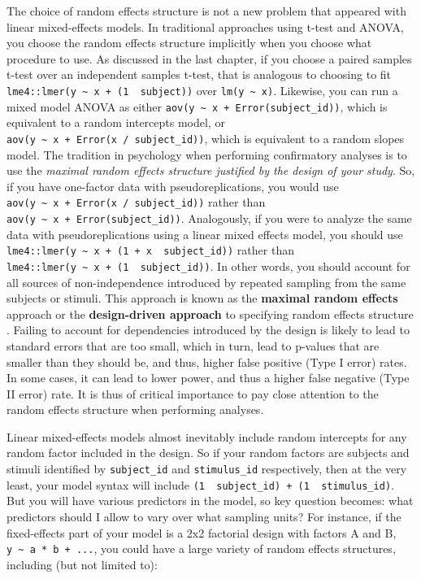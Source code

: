 \documentclass[]{book}
\begin{document}
The choice of random effects structure is not a new problem that appeared with linear mixed-effects models. In traditional approaches using t-test and ANOVA, you choose the random effects structure implicitly when you choose what procedure to use. As discussed in the last chapter, if you choose a paired samples t-test over an independent samples t-test, that is analogous to choosing to fit \texttt{lme4::lmer(y\ \textasciitilde{}\ x\ +\ (1\ \textbar{}\ subject))} over \texttt{lm(y\ \textasciitilde{}\ x)}. Likewise, you can run a mixed model ANOVA as either \texttt{aov(y\ \textasciitilde{}\ x\ +\ Error(subject\_id))}, which is equivalent to a random intercepts model, or \texttt{aov(y\ \textasciitilde{}\ x\ +\ Error(x\ /\ subject\_id))}, which is equivalent to a random slopes model. The tradition in psychology when performing confirmatory analyses is to use the \emph{maximal random effects structure justified by the design of your study}. So, if you have one-factor data with pseudoreplications, you would use \texttt{aov(y\ \textasciitilde{}\ x\ +\ Error(x\ /\ subject\_id))} rather than \texttt{aov(y\ \textasciitilde{}\ x\ +\ Error(subject\_id))}. Analogously, if you were to analyze the same data with pseudoreplications using a linear mixed effects model, you should use \texttt{lme4::lmer(y\ \textasciitilde{}\ x\ +\ (1\ +\ x\ \textbar{}\ subject\_id))} rather than \texttt{lme4::lmer(y\ \textasciitilde{}\ x\ +\ (1\ \textbar{}\ subject\_id))}. In other words, you should account for all sources of non-independence introduced by repeated sampling from the same subjects or stimuli. This approach is known as the \textbf{maximal random effects} approach or the \textbf{design-driven approach} to specifying random effects structure \citep{Barr_et_al_2013}. Failing to account for dependencies introduced by the design is likely to lead to standard errors that are too small, which in turn, lead to p-values that are smaller than they should be, and thus, higher false positive (Type I error) rates. In some cases, it can lead to lower power, and thus a higher false negative (Type II error) rate. It is thus of critical importance to pay close attention to the random effects structure when performing analyses.

Linear mixed-effects models almost inevitably include random intercepts for any random factor included in the design. So if your random factors are subjects and stimuli identified by \texttt{subject\_id} and \texttt{stimulus\_id} respectively, then at the very least, your model syntax will include \texttt{(1\ \textbar{}\ subject\_id)\ +\ (1\ \textbar{}\ stimulus\_id)}. But you will have various predictors in the model, so key question becomes: what predictors should I allow to vary over what sampling units? For instance, if the fixed-effects part of your model is a 2x2 factorial design with factors A and B, \texttt{y\ \textasciitilde{}\ a\ *\ b\ +\ ...}, you could have a large variety of random effects structures, including (but not limited to):
\end{document}
